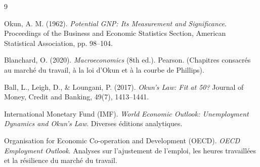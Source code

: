 \documentclass[11pt,a4paper]{article}
\begin{document}
\begin{thebibliography}{9}

Okun, A. M. (1962). \textit{Potential GNP: Its Measurement and Significance}. Proceedings of the Business and Economic Statistics Section, American Statistical Association, pp. 98--104.

Blanchard, O. (2020). \textit{Macroeconomics} (8th ed.). Pearson. (Chapitres consacrés au marché du travail, à la loi d'Okun et à la courbe de Phillips).

Ball, L., Leigh, D., \& Loungani, P. (2017). \textit{Okun's Law: Fit at 50?} Journal of Money, Credit and Banking, 49(7), 1413--1441.

International Monetary Fund (IMF). \textit{World Economic Outlook: Unemployment Dynamics and Okun's Law}. Diverses éditions analytiques.

Organisation for Economic Co-operation and Development (OECD). \textit{OECD Employment Outlook}. Analyses sur l'ajustement de l'emploi, les heures travaillées et la résilience du marché du travail.

\end{thebibliography}
\end{document}
